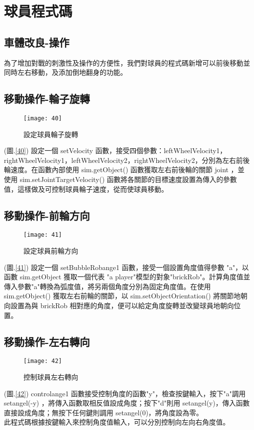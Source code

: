 \chapter{球員程式碼}
\renewcommand{\baselinestretch}{10.0} %
\setcounter{page}{4}  %
\fontsize{14pt}{2.5pt}\sectionef
\section{車體改良-操作}
  為了增加對戰的刺激性及操作的方便性，我們對球員的程式碼新增可以前後移動並同時左右移動，及添加倒地翻身的功能。\\[1pt]

\section{移動操作-輪子旋轉}
\begin{figure}[hbt!]
\begin{center}
\texttt{[image: 40]}
\caption{\Large 設定球員輪子旋轉}\label{fig.40}
\end{center}
\end{figure}
(圖.\ref{40}) 設定一個 setVelocity 函數，接受四個參數：leftWheelVelocity1，rightWheelVelocity1，leftWheelVelocity2，rightWheelVelocity2，分別為左右前後輪速度。在函數內部使用 sim.getObject() 函數獲取左右前後輪的關節 joint ，並使用 sim.setJointTargetVelocity() 函數將各關節的目標速度設置為傳入的參數值，這樣做及可控制球員輪子速度，從而使球員移動。\\
\newpage
\section{移動操作-前輪方向}
\begin{figure}[hbt!]
\begin{center}
\texttt{[image: 41]}
\caption{\Large 設定球員前輪方向}\label{fig.41}
\end{center}
\end{figure}
(圖.\ref{41}) 設定一個 setBubbleRobange1 函數，接受一個設置角度值得參數 "a"，以函數 sim.getObject 獲取一個代表 "a player"模型的對象"brickRob"。計算角度值並傳入參數"a"轉換為弧度值，將另兩個角度分別為固定角度值。在使用 sim.getObject() 獲取左右前輪的關節，以 sim.setObjectOrientation() 將關節地朝向設置為與 brickRob 相對應的角度，便可以給定角度旋轉並改變球員地朝向位置。\\
\section{移動操作-左右轉向}
\begin{figure}[hbt!]
\begin{center}
\texttt{[image: 42]}
\caption{\Large 控制球員左右轉向}\label{fig.42}
\end{center}
\end{figure}
(圖.\ref{42}) controlange1 函數接受控制角度的函數"y"，檢查按鍵輸入，按下"a"調用 setangel(-y) ，將傳入函數取相反值設成角度；按下"d"則用 setangel(y)，傳入函數直接設成角度；無按下任何鍵則調用 setangel(0)，將角度設為零。\\
  此程式碼根據按鍵輸入來控制角度值輸入，可以分別控制向左向右角度值。\\
